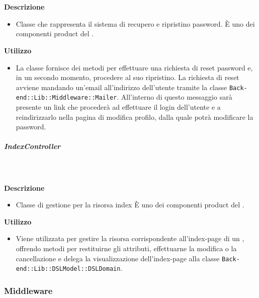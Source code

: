         \textbf{\\ \\ Descrizione} 
          \begin{itemize}
            \item[] Classe che rappresenta il sistema di recupero e ripristino password. È uno dei componenti product del  .
          \end{itemize}      
        \textbf{Utilizzo}  
          \begin{itemize}
            \item[] La classe fornisce dei metodi per effettuare una richiesta di reset password e, in un secondo momento, procedere al suo ripristino. La richiesta di reset avviene mandando un'email all'indirizzo dell'utente tramite la classe \texttt{Back-end::Lib::Middleware::Mailer}. All'interno di questo messaggio sarà presente un link che procederà ad effettuare il login dell'utente e a reindirizzarlo nella pagina di modifica profilo, dalla quale potrà modificare la password.
          \end{itemize}
      \subparagraph{IndexController}
        
        \textbf{\\ \\ Descrizione} 
          \begin{itemize}
            \item[] Classe di gestione per la risorsa index 
È uno dei componenti product del  .

          \end{itemize}      
        \textbf{Utilizzo}  
          \begin{itemize}
            \item[] Viene utilizzata per gestire la risorsa corrispondente all'index-page di un , offrendo metodi per restituirne gli attributi, effettuarne la modifica o la cancellazione e delega la visualizzazione dell'index-page alla classe \texttt{Back-end::Lib::DSLModel::DSLDomain}.

          \end{itemize}
  \subsubsection{Middleware}
